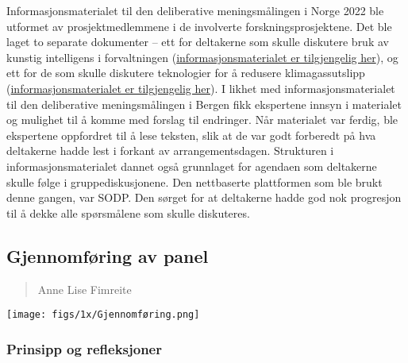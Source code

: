 \documentclass[
  12pt,
  a4paper, 12pt]{article}
\begin{document}
Informasjonsmaterialet til den deliberative meningsmålingen i Norge 2022 ble utformet av prosjektmedlemmene i de involverte forskningsprosjektene. Det ble laget to separate dokumenter -- ett for deltakerne som skulle diskutere bruk av kunstig intelligens i forvaltningen (\href{https://norceresearch.s3.amazonaws.com/Final-Informasjonsmateriell-til-diskusjon_September-versjon.pdf?v=1661350008}{informasjonsmaterialet er tilgjengelig her}), og ett for de som skulle diskutere teknologier for å redusere klimagassutslipp (\href{https://norceresearch.s3.amazonaws.com/fairgov_infoskriv_komp.pdf?v=1663060533}{informasjonsmaterialet er tilgjengelig her}). I likhet med informasjonsmaterialet til den deliberative meningsmålingen i Bergen fikk ekspertene innsyn i materialet og mulighet til å komme med forslag til endringer. Når materialet var ferdig, ble ekspertene oppfordret til å lese teksten, slik at de var godt forberedt på hva deltakerne hadde lest i forkant av arrangementsdagen. Strukturen i informasjonsmaterialet dannet også grunnlaget for agendaen som deltakerne skulle følge i gruppediskusjonene. Den nettbaserte plattformen som ble brukt denne gangen, var SODP. Den sørget for at deltakerne hadde god nok progresjon til å dekke alle spørsmålene som skulle diskuteres.

\newpage

\hypertarget{etter}{%
\subsection{Gjennomføring av panel}\label{etter}}

\begin{quote}
Anne Lise Fimreite
\end{quote}

\texttt{[image: figs/1x/Gjennomføring.png]}

\hypertarget{prinsipp-og-refleksjoner}{%
\subsubsection{Prinsipp og refleksjoner}\label{prinsipp-og-refleksjoner}}
\end{document}
